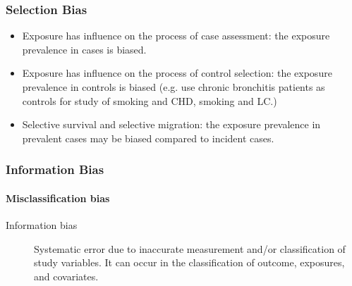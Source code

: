\documentclass[table,10pt]{beamer}
\begin{document}
\begin{CJK*}{UTF8}{gbsn}
\begin{frame}[t]
\frametitle{Selection Bias}
\begin{itemize}
	\item Exposure has influence on the process of case assessment: the 
		exposure prevalence in cases is biased.
	\item Exposure has influence on the process of control selection: the 
		exposure prevalence in controls is biased (e.g. use chronic 
		bronchitis patients as controls for study of smoking and CHD, 
		smoking and LC.)
	\item \alert{Selective survival} and \alert{selective migration}: the 
		exposure prevalence in prevalent cases may be biased compared 
		to incident cases. 
\end{itemize}
\end{frame}

\begin{frame}[t]
\frametitle{Information Bias}
\framesubtitle{Misclassification bias}
\begin{description}
	\item[Information bias]{Systematic error due to inaccurate measurement and/or 
		classification of study variables. It can occur in the classification 
		of outcome, exposures, and covariates.}
\end{description}
\end{frame}


\end{CJK*}
\end{document}

